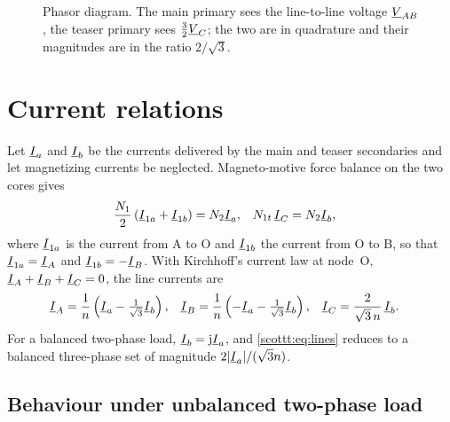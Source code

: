 \begin{figure}[htbp]
\centering
{}
\caption{Phasor diagram. The main primary sees the line-to-line voltage
$\underline{V}_{AB}$, the teaser primary sees $\tfrac{3}{2}\underline{V}_{C}$; the two are in
quadrature and their magnitudes are in the ratio $2/\sqrt{3}$.}
\label{scottt:fig:phasor}
\end{figure}

\section{Current relations}

Let $\underline{I}_a$ and $\underline{I}_b$ be the currents delivered by the main and teaser
secondaries and let magnetizing currents be neglected. Magneto-motive force
balance on the two cores gives
\begin{align}
\frac{N_1}{2}\left(\underline{I}_{1a} + \underline{I}_{1b}\right) &= N_2 \underline{I}_a, &
N_{1t}\,\underline{I}_C &= N_2 \underline{I}_b ,
\end{align}
where $\underline{I}_{1a}$ is the current from A to O and $\underline{I}_{1b}$ the current
from O to B, so that $\underline{I}_{1a} = \underline{I}_A$ and $\underline{I}_{1b} = -\underline{I}_B$.
With Kirchhoff's current law at node~O, $\underline{I}_A+\underline{I}_B+\underline{I}_C = 0$, the
line currents are
\begin{align}
\underline{I}_A &= \frac{1}{n}\left(\underline{I}_a - \tfrac{1}{\sqrt{3}}\underline{I}_b\right), &
\underline{I}_B &= \frac{1}{n}\left(-\underline{I}_a - \tfrac{1}{\sqrt{3}}\underline{I}_b\right), &
\underline{I}_C &= \frac{2}{\sqrt{3}\,n}\,\underline{I}_b .
\label{scottt:eq:lines}
\end{align}
For a balanced two-phase load, $\underline{I}_b = \mathrm{j}\underline{I}_a$, and
\eqref{scottt:eq:lines} reduces to a balanced three-phase set of magnitude
$2\lvert\underline{I}_a\rvert/(\sqrt{3}n)$.

\subsection*{Behaviour under unbalanced two-phase load}

